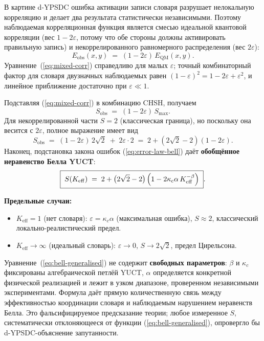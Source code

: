 \documentclass[12pt,a4paper]{article}
\theoremstyle{remark}
\begin{document}
	В картине d-YPSDC ошибка активации записи словаря разрушает нелокальную корреляцию и делает два результата статистически независимыми. Поэтому наблюдаемая корреляционная функция является смесью идеальной квантовой корреляции (вес $1-2\varepsilon$, потому что обе стороны должны активировать правильную запись) и некоррелированного равномерного распределения (вес $2\varepsilon$):
	\begin{equation}
		E_{\mathrm{obs}}(x,y) \;=\; (1-2\varepsilon)\,E_{\mathrm{QM}}(x,y).
		\label{eq:mixed-corr}
	\end{equation}
	Уравнение~(\ref{eq:mixed-corr}) справедливо для малых $\varepsilon$; точный комбинаторный фактор для словаря двузначных наблюдаемых равен $(1-\varepsilon)^2 = 1-2\varepsilon + \varepsilon^2$, и линейное приближение достаточно при $\varepsilon\ll1$.
	
	Подставляя (\ref{eq:mixed-corr}) в комбинацию CHSH, получаем
	\[
	S_{\mathrm{obs}} \;=\; (1-2\varepsilon)\,S_{\max}.
	\]
	Для некоррелированной части $S=2$ (классическая граница), но поскольку она весится с $2\varepsilon$, полное выражение имеет вид
	\begin{equation}
		S_{\mathrm{obs}} \;=\; (1-2\varepsilon)\,2\sqrt{2} \;+\; 2\varepsilon\cdot 2
		\;=\; 2 + (2\sqrt{2}-2)(1-2\varepsilon).
		\label{eq:Sobs-intermediate}
	\end{equation}
	Наконец, подстановка закона ошибок (\ref{eq:error-law-bell}) даёт
	\textbf{обобщённое неравенство Белла YUCT}:
	\begin{equation}
		\boxed{\;
			S(K_{\mathrm{eff}}) \;=\; 2 + \bigl(2\sqrt{2}-2\bigr)\,
			\Bigl(1 - 2\kappa_c\alpha\,K_{\mathrm{eff}}^{-\beta}\Bigr)
			\;}.
		\label{eq:bell-generalised}
	\end{equation}
	
	\noindent
	\textbf{Предельные случаи:}
	\begin{itemize}
		\item $K_{\mathrm{eff}}=1$ (нет словаря): $\varepsilon = \kappa_c\alpha$ (максимальная ошибка), $S \approx 2$, классический локально-реалистический предел.
		\item $K_{\mathrm{eff}}\to\infty$ (идеальный словарь): $\varepsilon\to0$, $S\to 2\sqrt{2}$, предел Цирельсона.
	\end{itemize}
	
	Уравнение~(\ref{eq:bell-generalised}) не содержит \textbf{свободных параметров}: $\beta$ и $\kappa_c$ фиксированы алгебраической петлёй YUCT, $\alpha$ определяется конкретной физической реализацией и лежит в узком диапазоне, проверенном независимыми экспериментами. Формула даёт прямую количественную связь между эффективностью координации словаря и наблюдаемым нарушением неравенств Белла. Это фальсифицируемое предсказание теории; любое измеренное $S$, систематически отклоняющееся от функции (\ref{eq:bell-generalised}), опровергло бы d-YPSDC-объяснение запутанности.
	
\end{document}
